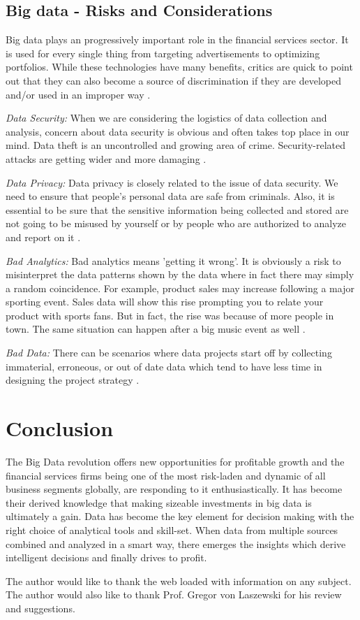 \documentclass[sigconf]{acmart}
\begin{document}
\subsection{Big data - Risks and Considerations}

Big data plays an progressively important role in the financial services sector. It is used for every single thing from targeting advertisements to optimizing portfolios. While these technologies have many benefits, critics are quick to point out that they can also become a source of discrimination if they are developed and/or used in an improper way \cite{risk-with-bigdata}.

\textit{Data Security:} When we are considering the logistics of data collection and analysis, concern about data security is obvious and often takes top place in our mind. Data theft is an uncontrolled and growing area of crime. Security-related attacks are getting wider and more damaging \cite{5risks-bigdata}.

\textit{Data Privacy:} Data privacy is closely related to the issue of data security. We need to ensure that people's personal data are safe from criminals. Also, it is essential to be sure that the sensitive information being collected and stored are not going to be misused by yourself or by people who are authorized to analyze and report on it \cite{5risks-bigdata}.

\textit{Bad Analytics:} Bad analytics means 'getting it wrong'. It is obviously a risk to misinterpret the data patterns shown by the data where in fact there may simply a random coincidence. For example, product sales may increase following a major sporting event. Sales data will show this rise prompting you to relate your product with sports fans. But in fact, the rise was because of more people in town. The same situation can happen after a big music event as well \cite{5risks-bigdata}.

\textit{Bad Data:} There can be scenarios where data projects start off by collecting immaterial, erroneous, or out of date data which tend to have less time in designing the project strategy \cite{5risks-bigdata}.


\section{Conclusion}
The Big Data revolution offers new opportunities for profitable growth and the financial services firms being one of the most risk-laden and dynamic of all business segments globally, are responding to it enthusiastically. It has become their derived knowledge that making sizeable investments in big data is ultimately a gain. Data has become the key element for decision making with the right choice of analytical tools and skill-set. When data from multiple sources combined and analyzed in a smart way, there emerges the insights which derive intelligent decisions and finally drives to profit.

\begin{acks}

The author would like to thank the web loaded with information on any subject. The author would also like to thank Prof. Gregor von Laszewski for his review and suggestions.

\end{acks}



 
\end{document}
